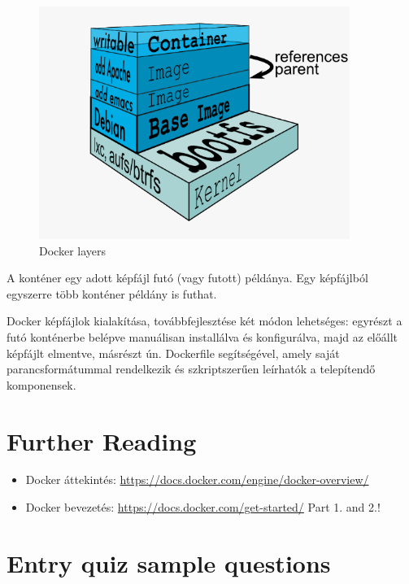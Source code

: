 \documentclass[a4paper]{article}
\begin{document}
\begin{figure}[H]
    \centering
    \includegraphics[width=0.9\textwidth]{figures/docker_layers.png}
    \caption{Docker layers}
    \label{fig:layers}
\end{figure}

A konténer egy adott képfájl futó (vagy futott) példánya. Egy képfájlból egyszerre több konténer példány is futhat.

Docker képfájlok kialakítása, továbbfejlesztése két módon lehetséges: egyrészt a futó konténerbe belépve manuálisan
installálva és konfigurálva, majd az előállt képfájlt elmentve, másrészt ún. Dockerfile segítségével, amely saját
parancsformátummal rendelkezik és szkriptszerűen leírhatók a telepítendő komponensek.

\section{Further Reading}

\begin{itemize}
    \item Docker áttekintés: \url{https://docs.docker.com/engine/docker-overview/}
    \item Docker bevezetés: \url{https://docs.docker.com/get-started/} Part 1. and 2.!
\end{itemize}

\appendix

\section{Entry quiz sample questions}
\end{document}
